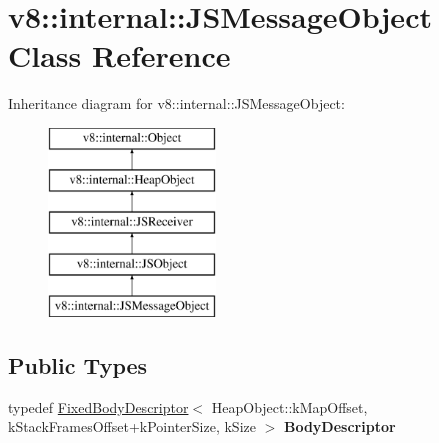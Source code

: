 \hypertarget{classv8_1_1internal_1_1_j_s_message_object}{}\section{v8\+:\+:internal\+:\+:J\+S\+Message\+Object Class Reference}
\label{classv8_1_1internal_1_1_j_s_message_object}
Inheritance diagram for v8\+:\+:internal\+:\+:J\+S\+Message\+Object\+:\begin{figure}[H]
\begin{center}
\leavevmode
\includegraphics[height=5.000000cm]{classv8_1_1internal_1_1_j_s_message_object}
\end{center}
\end{figure}
\subsection*{Public Types}
\begin{DoxyCompactItemize}
\item 
typedef \hyperlink{classv8_1_1internal_1_1_fixed_body_descriptor}{Fixed\+Body\+Descriptor}$<$ Heap\+Object\+::k\+Map\+Offset, k\+Stack\+Frames\+Offset+k\+Pointer\+Size, k\+Size $>$ {\bfseries Body\+Descriptor}\hypertarget{classv8_1_1internal_1_1_j_s_message_object_a3376424f5b249cefd2f910cde0bca8ba}{}\label{classv8_1_1internal_1_1_j_s_message_object_a3376424f5b249cefd2f910cde0bca8ba}

\end{DoxyCompactItemize}

